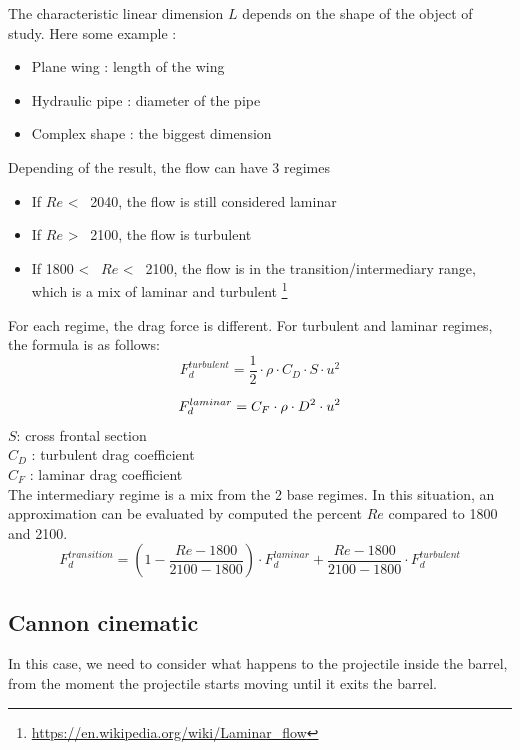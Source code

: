 \documentclass[12pt,a4paper]{article}
\begin{document}
The characteristic linear dimension $L$ depends on the shape of the object of study. Here some example : 
\begin{itemize}
	\item Plane wing : length of the wing
	\item Hydraulic pipe : diameter of the pipe
	\item Complex shape : the biggest dimension
\end{itemize}
Depending of the result, the flow can have 3 regimes

\begin{itemize}
	\item If $Re$ <~ 2040, the flow is still considered laminar 
	\item If $Re$ >~ 2100, the flow is turbulent
	\item If 1800 <~ $Re$ <~ 2100, the flow is in the transition/intermediary range, which is a mix of laminar and turbulent \footnote{\url{https://en.wikipedia.org/wiki/Laminar_flow}}
\end{itemize}

For each regime, the drag force is different. 
For turbulent and laminar regimes, the formula is as follows:
\begin{equation}
	F_d^{turbulent} = \frac{1}{2} \cdot \rho \cdot C_D \cdot S \cdot u^2
\end{equation}

\begin{equation}
	F_d^{laminar} = C_F \cdot \rho \cdot  D^2 \cdot u^2\\
\end{equation}
$S$: cross frontal section\\
$C_D$ : turbulent drag coefficient\\
$C_F$ : laminar drag coefficient\\

The intermediary regime is a mix from the 2 base regimes. In this situation, an approximation can be evaluated by computed the percent $Re$ compared to 1800 and 2100. 
\begin{equation}
	F_d^{transition} = (1- \frac{Re - 1800}{2100-1800}) \cdot F_d^{laminar} + \frac{Re - 1800}{2100-1800} \cdot F_d^{turbulent}
\end{equation}

\subsection{Cannon cinematic}
In this case, we need to consider what happens to the projectile inside the barrel, from the moment the projectile starts moving until it exits the barrel. 
\end{document}
